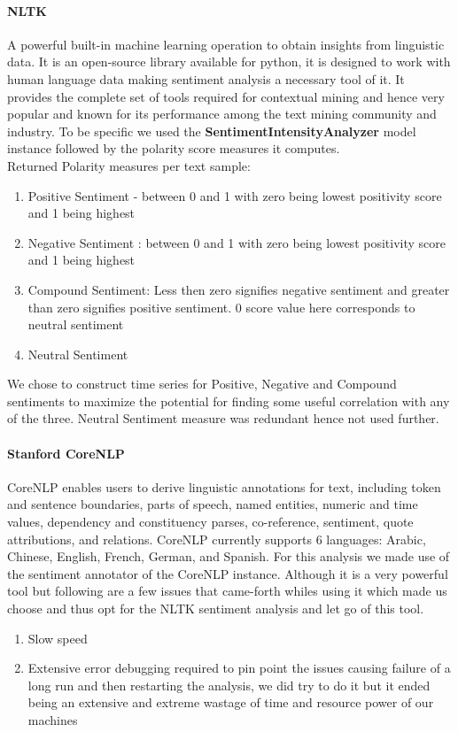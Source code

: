 \documentclass[sigconf, nonacm]{acmart}
\begin{document}
\paragraph{NLTK}
A powerful built-in machine learning operation to obtain insights from linguistic data. It is an open-source library available for python, it is designed to work with human language data making sentiment analysis a necessary tool of it. It provides the complete set of tools required for contextual mining and hence very popular and known for its performance among the text mining community and industry. To be specific we used the \textbf{SentimentIntensityAnalyzer} model instance followed by the polarity score measures it computes.
\\Returned Polarity measures per text sample:
\begin{enumerate}
    \item Positive Sentiment - between 0 and 1 with zero being lowest positivity score and 1 being highest
    \item Negative Sentiment : between 0 and 1 with zero being lowest positivity score and 1 being highest
    \item Compound Sentiment: Less then zero signifies negative sentiment and greater than zero signifies positive sentiment. 0 score value here corresponds to neutral sentiment
    \item Neutral Sentiment
\end{enumerate}
We chose to construct time series for Positive, Negative and Compound sentiments to maximize the potential for finding some useful correlation with any of the three. Neutral Sentiment measure was redundant hence not used further.

\paragraph{Stanford CoreNLP}
CoreNLP enables users to derive linguistic annotations for text, including token and sentence boundaries, parts of speech, named entities, numeric and time values, dependency and constituency parses, co-reference, sentiment, quote attributions, and relations. CoreNLP currently supports 6 languages: Arabic, Chinese, English, French, German, and Spanish. For this analysis we made use of the sentiment annotator of the CoreNLP instance. Although it is a very powerful tool but following are a few issues that came-forth whiles using it which  made us choose and thus opt for the NLTK sentiment analysis and let go of this tool.
\begin{enumerate}
    \item Slow speed
    \item Extensive error debugging required to pin point the issues causing failure of a long run and then restarting the analysis, we did try to do it but it ended being an extensive and extreme wastage of time and resource power of our machines
\end{enumerate}
\end{document}

